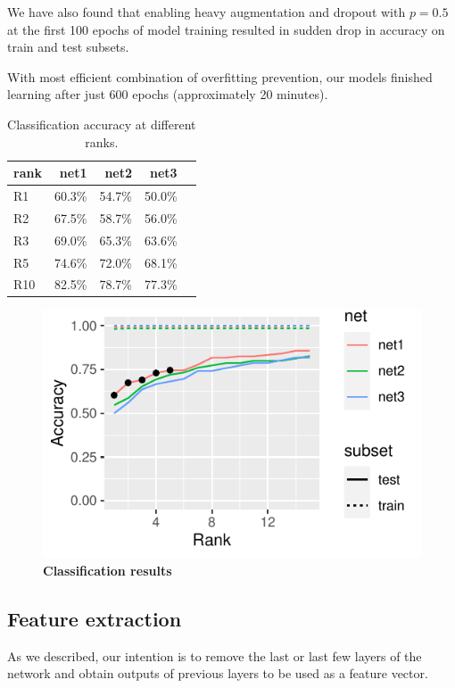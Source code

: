 \documentclass[fleqn,moreauthors,10pt]{ds_report}
\begin{document}
We have also found that enabling heavy augmentation and dropout with $p = 0.5$ at the first 100 epochs of model training resulted in sudden drop in accuracy on train and test subsets.

With most efficient combination of overfitting prevention, our models finished learning after just 600 epochs (approximately 20 minutes).

\begin{table}[hbt]
	\caption{Classification accuracy at different ranks.}
	\centering
	\begin{tabular}{l r r r r}
		\toprule
		rank & net1     & net2     & net3    \\
		\midrule
		R1   & 60.3\%  & 54.7\%  & 50.0\% \\
		R2   & 67.5\%  & 58.7\%  & 56.0\% \\
		R3   & 69.0\%  & 65.3\%  & 63.6\% \\
		R5   & 74.6\%  & 72.0\%  & 68.1\% \\
		R10  & 82.5\%  & 78.7\%  & 77.3\% \\
		\bottomrule
	\end{tabular}
	\label{tab:classification-results}
\end{table}

\begin{figure}[htb]\centering
	\includegraphics[width=0.9\linewidth]{ranks-classification.pdf}
	\caption{\textbf{Classification results}}
	\label{fig:classification-results}
\end{figure}

\subsection*{Feature extraction}

As we described, our intention is to remove the last or last few layers of the network and obtain outputs of previous layers to be used as a feature vector. 
\end{document}
